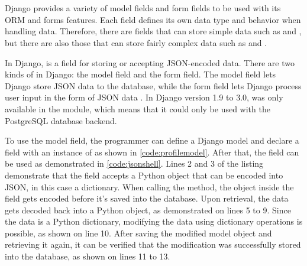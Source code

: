 \section{}

Django provides a variety of model fields and form fields to be used with its
ORM and forms features. Each field defines its own data type and behavior when
handling data. Therefore, there are fields that can store simple data such as
 and , but there are also those that can
store fairly complex data such as  and .

In Django,  is a field for storing or accepting JSON-encoded
data. There are two kinds of  in Django: the model field and
the form field. The model field lets Django store JSON data to the database,
while the form field lets Django process user input in the form of JSON data
\cite{django30_modeljsonfield, django30_formjsonfield}. In Django version
1.9 to 3.0,  was only available in the
 module, which means that it could only be used
with the PostgreSQL database backend.



\noindent
\begin{minipage}{\linewidth}

\end{minipage}

To use the  model field, the programmer can define a Django
model and declare a field with an instance of  as shown in
\autoref{code:profilemodel}. After that, the field can be used as demonstrated
in \autoref{code:jsonshell}. Lines 2 and 3 of the listing demonstrate that the
field accepts a Python object that can be encoded into JSON, in this case a
dictionary. When calling the  method, the object inside the
field gets encoded before it's saved into the database. Upon retrieval, the
data gets decoded back into a Python object, as demonstrated on lines 5 to 9.
Since the data is a Python dictionary, modifying the data using dictionary
operations is possible, as shown on line 10. After saving the modified model
object and retrieving it again, it can be verified that the modification was
successfully stored into the database, as shown on lines 11 to 13.

